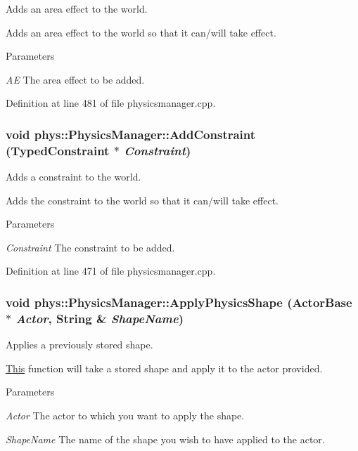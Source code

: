 Adds an area effect to the world. 

Adds an area effect to the world so that it can/will take effect. 
\begin{DoxyParams}{Parameters}
\item[{\em AE}]The area effect to be added. \end{DoxyParams}


Definition at line 481 of file physicsmanager.cpp.

\hypertarget{classphys_1_1PhysicsManager_ab31bf38e9ed68c484946731546425691}{
\subsubsection[{AddConstraint}]{\setlength{\rightskip}{0pt plus 5cm}void phys::PhysicsManager::AddConstraint ({\bf TypedConstraint} $\ast$ {\em Constraint})}}
\label{d3/dcc/classphys_1_1PhysicsManager_ab31bf38e9ed68c484946731546425691}


Adds a constraint to the world. 

Adds the constraint to the world so that it can/will take effect. 
\begin{DoxyParams}{Parameters}
\item[{\em Constraint}]The constraint to be added. \end{DoxyParams}


Definition at line 471 of file physicsmanager.cpp.

\hypertarget{classphys_1_1PhysicsManager_a58653c59133900a432169a7c980105ce}{
\subsubsection[{ApplyPhysicsShape}]{\setlength{\rightskip}{0pt plus 5cm}void phys::PhysicsManager::ApplyPhysicsShape ({\bf ActorBase} $\ast$ {\em Actor}, \/  {\bf String} \& {\em ShapeName})}}
\label{d3/dcc/classphys_1_1PhysicsManager_a58653c59133900a432169a7c980105ce}


Applies a previously stored shape. 

\hyperlink{structThis}{This} function will take a stored shape and apply it to the actor provided. 
\begin{DoxyParams}{Parameters}
\item[{\em Actor}]The actor to which you want to apply the shape. \item[{\em ShapeName}]The name of the shape you wish to have applied to the actor. \end{DoxyParams}


